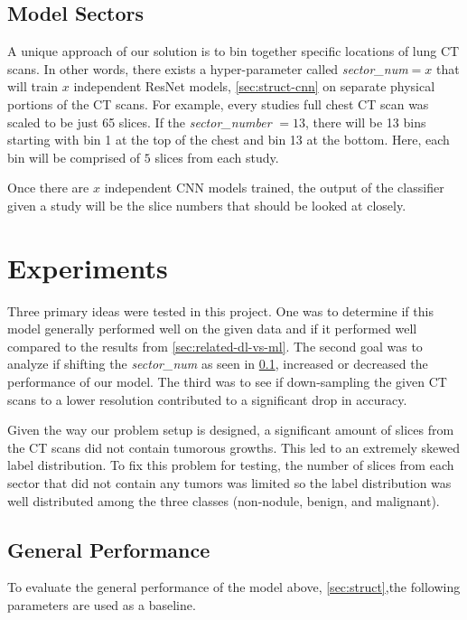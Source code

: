\documentclass[10pt,twocolumn,letterpaper]{article}
\begin{document}
   \subsection{Model Sectors} \label{sec:struct-sector}

        A unique approach of our solution is to bin together specific locations of lung CT scans. In other words, there exists
        a hyper-parameter called {\it sector\_num}$=x$ that will train $x$ independent ResNet models, \ref{sec:struct-cnn} on separate
        physical portions of the CT scans. For example, every studies full chest CT scan was scaled to be just 65 slices. If the {\it sector\_number} $=13$,
        there will be 13 bins starting with bin 1 at the top of the chest and bin 13 at the bottom. Here, each bin will be comprised
        of $5$ slices from each study.
    
        Once there are $x$ independent CNN models trained, the output of the classifier given a study will
        be the slice numbers that should be looked at closely.

\section{Experiments} \label{sec:experiments}
   Three primary ideas were tested in this project. One was to determine if this model generally performed well on the given data and if it performed well
   compared to the results from \ref{sec:related-dl-vs-ml}. The second goal was to analyze if shifting the
   {\it sector\_num} as seen in \ref{sec:struct-sector}, increased or decreased the performance of our model. The third was to see if down-sampling the 
   given CT scans to a lower resolution contributed to a significant drop in accuracy.

   Given the way our problem setup is designed, a significant amount of slices from the CT scans did not contain tumorous growths. This led to an extremely
   skewed label distribution. To fix this problem for testing, the number of slices from each sector that did not contain any tumors was limited so the label
   distribution was well distributed among the three classes (non-nodule, benign, and malignant).

   \subsection{General Performance} \label{sec:experiments-general-performance}
      To evaluate the general performance of the model above, \ref{sec:struct},the following parameters are used as a baseline.
\end{document}

